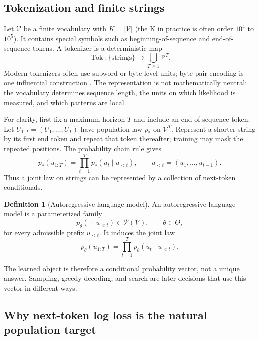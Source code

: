\documentclass[11pt]{amsart}
\numberwithin{equation}{section}
\theoremstyle{definition}
\newtheorem{definition}{Definition}[section]
\theoremstyle{plain}
\theoremstyle{remark}
\newcommand{\cP}{\mathcal{P}}
\begin{document}
\subsection{Tokenization and finite strings}

Let $\mathcal V$ be a finite vocabulary with $K=|\mathcal V|$ (the K in practice is often order $10^4$ to $10^5$).
It contains special symbols such as beginning-of-sequence and end-of-sequence tokens.  A
tokenizer is a deterministic map
\[
 \operatorname{Tok}:\{\text{strings}\}\longrightarrow
 \bigcup_{T\ge 1}\mathcal V^T.
\]
Modern tokenizers often use subword or byte-level units; byte-pair encoding is
one influential construction \cite{SennrichEtAl2016}.  The representation is
not mathematically neutral: the vocabulary determines sequence length, the
units on which likelihood is measured, and which patterns are local.

For clarity, first fix a maximum horizon $T$ and include an end-of-sequence
token.  Let $U_{1:T}=(U_1,\ldots,U_T)$ have population law $p_*$ on
$\mathcal V^T$.  Represent a shorter string by its first end token and repeat
that token thereafter; training may mask the repeated positions.  The
probability chain rule gives
\begin{equation}\label{eq:chain-rule}
 p_*(u_{1:T})
 =
 \prod_{t=1}^T p_*(u_t\mid u_{<t}),
 \qquad
 u_{<t}=(u_1,\ldots,u_{t-1}).
\end{equation}
Thus a joint law on strings can be represented by a collection of next-token
conditionals.

\begin{definition}[Autoregressive language model]
\label{def:autoregressive-lm}
An autoregressive language model is a parameterized family
\[
 p_\theta(\,\cdot\mid u_{<t})\in\cP(\mathcal V),
 \qquad \theta\in\Theta,
\]
for every admissible prefix $u_{<t}$.  It induces the joint law
\begin{equation}\label{eq:model-joint-law}
 p_\theta(u_{1:T})
 =\prod_{t=1}^T p_\theta(u_t\mid u_{<t}).
\end{equation}
\end{definition}

The learned object is therefore a conditional probability vector, not a
unique answer.  Sampling, greedy decoding, and search are later decisions that
use this vector in different ways.

\subsection{Why next-token log loss is the natural population target}
\end{document}
